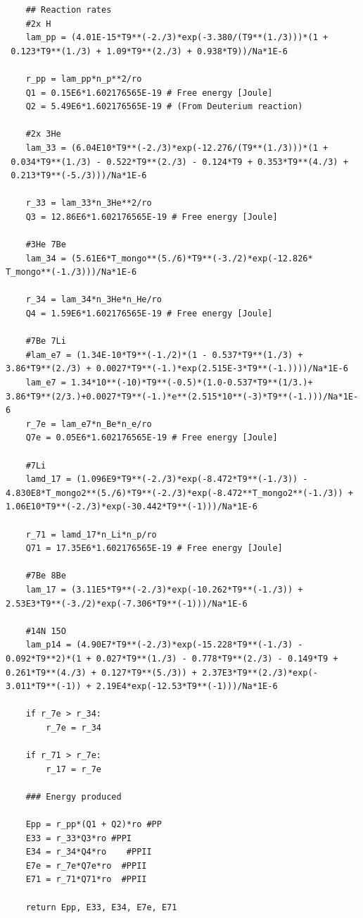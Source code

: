 \documentclass[norsk,a4paper,12pt]{article}
\begin{document}
\begin{lstlisting}
	## Reaction rates
	#2x H
	lam_pp = (4.01E-15*T9**(-2./3)*exp(-3.380/(T9**(1./3)))*(1 +
 0.123*T9**(1./3) + 1.09*T9**(2./3) + 0.938*T9))/Na*1E-6

	r_pp = lam_pp*n_p**2/ro
	Q1 = 0.15E6*1.602176565E-19 # Free energy [Joule]
	Q2 = 5.49E6*1.602176565E-19 # (From Deuterium reaction) 

	#2x 3He
	lam_33 = (6.04E10*T9**(-2./3)*exp(-12.276/(T9**(1./3)))*(1 +
 0.034*T9**(1./3) - 0.522*T9**(2./3) - 0.124*T9 + 0.353*T9**(4./3) +
 0.213*T9**(-5./3)))/Na*1E-6

	r_33 = lam_33*n_3He**2/ro
	Q3 = 12.86E6*1.602176565E-19 # Free energy [Joule]

	#3He 7Be
	lam_34 = (5.61E6*T_mongo**(5./6)*T9**(-3./2)*exp(-12.826*
T_mongo**(-1./3)))/Na*1E-6
	
	r_34 = lam_34*n_3He*n_He/ro
	Q4 = 1.59E6*1.602176565E-19 # Free energy [Joule]

	#7Be 7Li
	#lam_e7 = (1.34E-10*T9**(-1./2)*(1 - 0.537*T9**(1./3) + 
3.86*T9**(2./3) + 0.0027*T9**(-1.)*exp(2.515E-3*T9**(-1.))))/Na*1E-6
	lam_e7 = 1.34*10**(-10)*T9**(-0.5)*(1.0-0.537*T9**(1/3.)+
3.86*T9**(2/3.)+0.0027*T9**(-1.)*e**(2.515*10**(-3)*T9**(-1.)))/Na*1E-6
	r_7e = lam_e7*n_Be*n_e/ro
	Q7e = 0.05E6*1.602176565E-19 # Free energy [Joule]

	#7Li
	lamd_17 = (1.096E9*T9**(-2./3)*exp(-8.472*T9**(-1./3)) -
4.830E8*T_mongo2**(5./6)*T9**(-2./3)*exp(-8.472**T_mongo2**(-1./3)) + 
1.06E10*T9**(-2./3)*exp(-30.442*T9**(-1)))/Na*1E-6

	r_71 = lamd_17*n_Li*n_p/ro
	Q71 = 17.35E6*1.602176565E-19 # Free energy [Joule]	

	#7Be 8Be
	lam_17 = (3.11E5*T9**(-2./3)*exp(-10.262*T9**(-1./3)) + 
2.53E3*T9**(-3./2)*exp(-7.306*T9**(-1)))/Na*1E-6

	#14N 15O
	lam_p14 = (4.90E7*T9**(-2./3)*exp(-15.228*T9**(-1./3) - 
0.092*T9**2)*(1 + 0.027*T9**(1./3) - 0.778*T9**(2./3) - 0.149*T9 + 
0.261*T9**(4./3) + 0.127*T9**(5./3)) + 2.37E3*T9**(2./3)*exp(-
3.011*T9**(-1)) + 2.19E4*exp(-12.53*T9**(-1)))/Na*1E-6

	if r_7e > r_34:
		r_7e = r_34

	if r_71 > r_7e:
		r_17 = r_7e

	### Energy produced

	Epp = r_pp*(Q1 + Q2)*ro #PP
	E33 = r_33*Q3*ro #PPI
	E34 = r_34*Q4*ro	#PPII
	E7e = r_7e*Q7e*ro  #PPII
	E71 = r_71*Q71*ro  #PPII

	return Epp, E33, E34, E7e, E71




\end{lstlisting}
\end{document}
